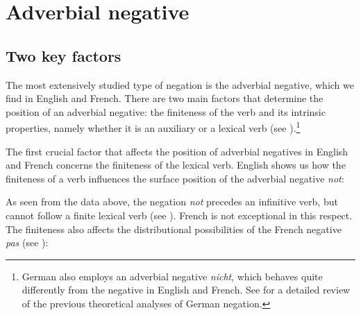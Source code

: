 \documentclass[output=paper
                ,modfonts
                		,nonflat
	        ,collection
	        ,collectionchapter
	        ,collectiontoclongg
 	        ,biblatex
                ,babelshorthands
                ,newtxmath
                ,draftmode
                ,colorlinks, citecolor=brown
]{./langsci/langscibook}
\begin{document}
{%
\section{Adverbial negative}

\subsection{Two key factors}


The most extensively studied type of negation is the adverbial negative, which
we find in English and French.
There are two main factors
that determine the position of an adverbial negative: the finiteness of
the verb and its intrinsic properties, namely whether it is an auxiliary
or a lexical  verb (see \citealt{Kim:00, KS:02}).\footnote{German also
employs an adverbial negative \textit{nicht}, which behaves quite
differently from the negative in English and French. See \citet{MuellerGT-Eng1}
for a detailed review of the previous theoretical analyses of German negation.}


The first crucial factor that affects  the position of adverbial
negatives in English and French concerns the finiteness of the lexical  verb.
English shows us how the finiteness of a verb influences the
surface position of the adverbial negative \textit{not}:

\begin{exe}
\ex\label{eng-fin-neg} \begin{xlist}
\zl


\begin{exe}
\ex\label{fr-fin-neg} \begin{xlist}
\zl
%
\noindent As seen from the data above, the negation \textit{not} precedes an infinitive verb, but cannot follow
a finite lexical  verb (see \citealt{Baker:89,Baker:91,Ernst:92}).
French is not exceptional in this respect. The finiteness also affects the distributional possibilities of the French negative {\it pas} (see \citealt{AG:97, KS:02, Zeijlstra:07}):

\eal{}
\zl


\end{xlist}
\end{exe}
\end{xlist}
\end{exe}}
\end{document}
